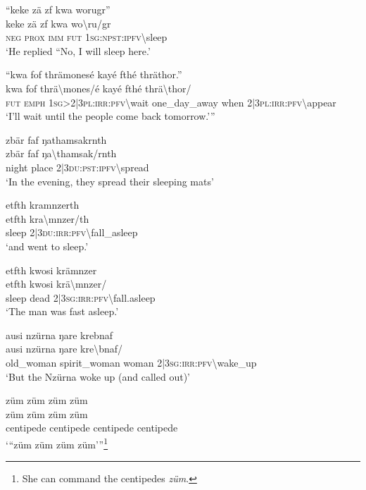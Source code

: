 \ea\label{ex:7:a4746}
``keke zä zf kwa worugr''\\
\gll keke	zä	zf	kwa	wo{\textbackslash}ru/gr\\
     \textsc{neg}	\textsc{prox}	\textsc{imm}	\textsc{fut}	1\textsc{sg}:\textsc{npst}:\textsc{ipfv}{\textbackslash}sleep\\
\glt `He replied ``No, I will sleep here.'
\z

\ea\label{ex:7:a4747}
``kwa fof thrämonesé kayé fthé thräthor.''\\
\gll kwa	fof	thrä{\textbackslash}mones/é	kayé	fthé	thrä{\textbackslash}thor/\\
     \textsc{fut}	\textsc{emph}	1\textsc{sg}>2|3\textsc{pl}:\textsc{irr}:\textsc{pfv}{\textbackslash}wait	one\_day\_away	when	2|3\textsc{pl}:\textsc{irr}:\textsc{pfv}{\textbackslash}appear\\
\glt `I'll wait until the people come back tomorrow.'''
\z

\ea\label{ex:7:a4749}
zbär faf ŋathamsakrnth\\
\gll zbär	faf	ŋa{\textbackslash}thamsak/rnth\\
     night	place	2|3\textsc{du}:\textsc{pst}:\textsc{ipfv}{\textbackslash}spread\\
\glt `In the evening, they spread their sleeping mats'
\z

\ea\label{ex:7:a4750}
etfth kramnzerth\\
\gll etfth	kra{\textbackslash}mnzer/th\\
     sleep	2|3\textsc{du}:\textsc{irr}:\textsc{pfv}{\textbackslash}fall\_asleep\\
\glt `and went to sleep.'
\z

\ea\label{ex:7:a4751}
etfth kwosi krämnzer\\
\gll etfth	kwosi	krä{\textbackslash}mnzer/\\
     sleep	dead	2|3\textsc{sg}:\textsc{irr}:\textsc{pfv}{\textbackslash}fall.asleep\\
\glt `The man was fast asleep.'
\z

\ea\label{ex:7:a4752}
ausi nzürna ŋare krebnaf\\
\gll ausi	nzürna	ŋare	kre{\textbackslash}bnaf/\\
     old\_woman	spirit\_woman	woman	2|3\textsc{sg}:\textsc{irr}:\textsc{pfv}{\textbackslash}wake\_up\\
\glt `But the Nzürna woke up (and called out)'
\z

\ea\label{ex:7:a4753}
züm züm züm züm\\
\gll züm	züm	züm	züm\\
     centipede	centipede	centipede	centipede\\
\glt `{``}züm züm züm züm'''\footnote{She can command the centipedes \textit{züm}.}
\z


